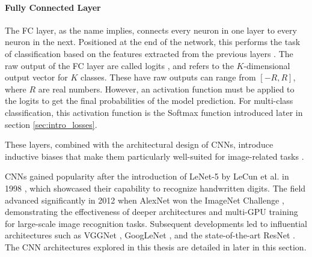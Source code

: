 \paragraph{Fully Connected Layer}
The FC layer, as the name implies, connects every neuron in one layer to every neuron in the next. Positioned at the end of the network, this performs the task of classification based on the features extracted from the previous layers \cite{cs231n}. The raw output of the FC layer are called logits \cite{arora2024logits}, and refers to the $K$-dimensional output vector for $K$ classes. These have raw outputs can range from $[-R,R]$, where $R$ are real numbers. However, an activation function must be applied to the logits to get the final probabilities of the model prediction. For multi-class classification, this activation function is the Softmax function introduced later in section \ref{sec:intro_losses}.
\vspace{1em}

\noindent These layers, combined with the architectural design of CNNs, introduce inductive biases that make them particularly well-suited for image-related tasks \cite{kim2020inductivebias}. 



CNNs gained popularity after the introduction of LeNet-5 by LeCun et al. in 1998 \cite{lecun1998}, which showcased their capability to recognize handwritten digits. The field advanced significantly in 2012 when AlexNet \cite{NIPS2012_c399862d} won the ImageNet Challenge \cite{ILSVRC15}, demonstrating the effectiveness of deeper architectures and multi-GPU training for large-scale image recognition tasks. Subsequent developments led to influential architectures such as VGGNet \cite{simonyan2015deepconvolutionalnetworkslargescale}, GoogLeNet \cite{szegedy2014goingdeeperconvolutions}, and the state-of-the-art ResNet \cite{he2015deepresiduallearningimage}. The CNN architectures explored in this thesis are detailed in later in this section.

